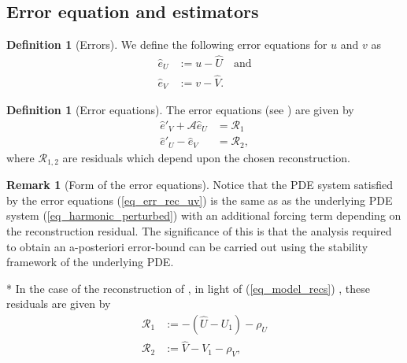 \documentclass[12pt,a4paper]{article}
\numberwithin{equation}{section}
\theoremstyle{definition}
\newcommand{\qp}[1]{\left(#1\right)}
\newtheorem{Defn}[subsection]{Definition}
\newtheorem{Rem}[subsection]{Remark}
\begin{document}
\subsection{Error equation and estimators}\label{subsec_error_estimators}
\begin{Defn}[Errors]\label{defn:errors}
We define the following error equations for $u$ and $v$ as
\begin{equation}\label{eq_err_rec_uv}
\begin{aligned}
\hat{e}_U&:=u-\hat{U} \quad \text{and}\\
\hat{e}_V&:=v-\hat{V}.
\end{aligned}
\end{equation}
\end{Defn}

\begin{Defn}[Error equations]
The error equations (see \cite[eq. 3.2]{georgoulis2016posteriori}) are given by 
\begin{equation}\label{eq_error_eqs}
\begin{aligned}
\hat{e}'_V+\mathcal{A}\hat{e}_U&=\mathcal{R}_1\\
\hat{e}'_U-\hat{e}_V&=\mathcal{R}_2,
\end{aligned}
\end{equation}
where  $\mathcal{R}_{1,2}$ are residuals which depend upon the chosen reconstruction.
\end{Defn}
\begin{Rem}[Form of the error equations]
Notice that the PDE system satisfied by the error equations (\ref{eq_err_rec_uv}) is the same as as the underlying PDE system (\ref{eq_harmonic_perturbed}) with an additional forcing term depending on the reconstruction residual.  The significance of this is that the analysis required to obtain an a-posteriori error-bound can be carried out using the stability framework of the underlying PDE.
\end{Rem}
\/*
 In the case of the reconstruction of \cite{georgoulis2016posteriori}, in light of (\ref{eq_model_recs}) , these residuals are given by
\begin{equation}\label{eq_residuals_paper}
\begin{aligned}
\mathcal{R}_1&:=-\left(\hat{U}-U_1\right)-\rho_U\\
\mathcal{R}_2&:=\hat{V}-V_1-\rho_V,
\end{aligned}
\end{equation}
\end{document}
